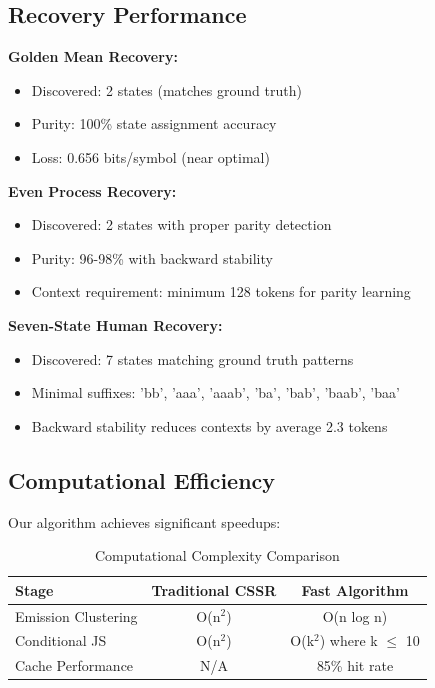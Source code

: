 \documentclass[12pt]{article}
\begin{document}
\subsection{Recovery Performance}

\textbf{Golden Mean Recovery:}
\begin{itemize}
    \item Discovered: 2 states (matches ground truth)
    \item Purity: 100\% state assignment accuracy
    \item Loss: 0.656 bits/symbol (near optimal)
\end{itemize}

\textbf{Even Process Recovery:}
\begin{itemize}
    \item Discovered: 2 states with proper parity detection
    \item Purity: 96-98\% with backward stability
    \item Context requirement: minimum 128 tokens for parity learning
\end{itemize}

\textbf{Seven-State Human Recovery:}
\begin{itemize}
    \item Discovered: 7 states matching ground truth patterns
    \item Minimal suffixes: 'bb', 'aaa', 'aaab', 'ba', 'bab', 'baab', 'baa'
    \item Backward stability reduces contexts by average 2.3 tokens
\end{itemize}

\subsection{Computational Efficiency}

Our algorithm achieves significant speedups:

\begin{table}[h]
\centering
\begin{tabular}{@{}lcc@{}}
\toprule
Stage & Traditional CSSR & Fast Algorithm \\
\midrule
Emission Clustering & O(n$^2$) & O(n log n) \\
Conditional JS & O(n$^2$) & O(k$^2$) where k $\leq$ 10 \\
Cache Performance & N/A & 85\% hit rate \\
\bottomrule
\end{tabular}
\caption{Computational Complexity Comparison}
\end{table}
\end{document}

